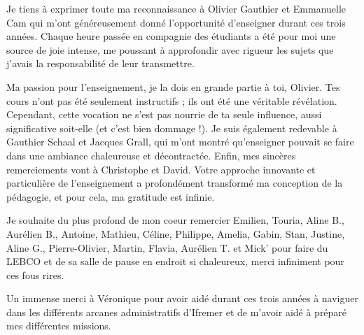 \begin{refsection}
Je tiens à exprimer toute ma reconnaissance à Olivier Gauthier et
Emmanuelle Cam qui m'ont généreusement donné l'opportunité d'enseigner
durant ces trois années. Chaque heure passée en compagnie des étudiants
a été pour moi une source de joie intense, me poussant à approfondir
avec rigueur les sujets que j'avais la responsabilité de leur
transmettre.

Ma passion pour l'enseignement, je la dois en grande partie à toi,
Olivier. Tes cours n'ont pas été seulement instructifs ; ils ont été une
véritable révélation. Cependant, cette vocation ne s'est pas nourrie de
ta seule influence, aussi significative soit-elle (et c'est bien dommage
!). Je suis également redevable à Gauthier Schaal et Jacques Grall, qui
m'ont montré qu'enseigner pouvait se faire dans une ambiance chaleureuse
et décontractée. Enfin, mes sincères remerciements vont à Christophe et
David. Votre approche innovante et particulière de l'enseignement a
profondément transformé ma conception de la pédagogie, et pour cela, ma
gratitude est infinie.

Je souhaite du plus profond de mon coeur remercier Emilien, Touria,
Aline B., Aurélien B., Antoine, Mathieu, Céline, Philippe, Amelia,
Gabin, Stan, Justine, Aline G., Pierre-Olivier, Martin, Flavia, Aurélien
T. et Mick' pour faire du LEBCO et de sa salle de pause en endroit si
chaleureux, merci infiniment pour ces fous rires.

Un immense merci à Véronique pour avoir aidé durant ces trois années à
naviguer dans les différents arcanes administratifs d'Ifremer et de
m'avoir aidé à préparé mes différentes missions.


\end{refsection}
